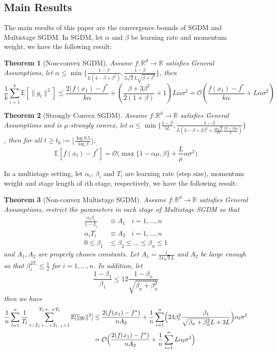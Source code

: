 \documentclass{article}
\newtheorem{theorem}{Theorem}[section]
\begin{document}
\subsection{Main Results}
The main results of this paper are the convergence bounds of SGDM and Multistage SGDM. In SGDM, let $\alpha$ and $\beta$ be learning rate and momentum weight, we have the following result:
\begin{theorem}[Non-convex SGDM] Assume $f:\mathbb{R}^d \rightarrow \mathbb{R}$ satisfies General Assumptions, let $\alpha \leq \min\{\frac{1 - \beta}{L(4 - \beta + \beta^2)}, \frac{1 - \beta}{2\sqrt{2}L\sqrt{\beta + \beta^2}}\}$, then
	\[
		\frac{1}{k}\sum_{i = 1}^{k}\mathbb{E}[\|g_t\|^2] \leq \frac{2 (f(x_1) - f^*}{k\alpha} + (\frac{\beta + 3\beta^2}{2 (1 + \beta)} + 1)L\alpha\sigma^2 = \mathcal{O}(\frac{f(x_1) - f^*}{k\alpha} + L\alpha\sigma^2)
	\]
\end{theorem}
\begin{theorem}[Strongly Convex SGDM] Assume $f:\mathbb{R}^d \rightarrow \mathbb{R}$ satisfies General Assumptions and is $\mu$-strongly convex, let $\alpha \leq \min\{\frac{1 - \beta}{5L}, \frac{1 - \beta}{L(3 - \beta + 2\beta^2 + \frac{48\sqrt{\beta}}{25}\frac{2L + 18\mu}{L})}\}$, then for all $t \geq t_0:= \lfloor\frac{\log 0.5}{\log \beta}\rfloor$, 
	\[
		\mathbb{E}[f(x_t) - f^*] = \mathcal{O}\bigl(\max\{1 - \alpha\mu, \beta\} + \frac{L}{\mu}\alpha\sigma^2\bigr)
	\]
\end{theorem}
In a multistage setting, let $\alpha_i$, $\beta_i$ and $T_i$ are learning rate (step size), momentum weight and stage length of $i$th stage, respectively, we have the following result:
\begin{theorem}[Non-convex Multistage SGDM] Assume $f:\mathbb{R}^d \rightarrow \mathbb{R}$ satisfies General Assumptions, restrict the parameters in each stage of Multistage SGDM so that 
\begin{equation}
\begin{split}
\frac{\alpha_i\beta_i}{1 - \beta_i} &\equiv A_1 \ \ \ \ i = 1,...,n\\
\alpha_iT_i &\equiv A_2 \ \ \ \ i = 1,...,n\\
0 \leq \beta_1 &\leq \beta_2 \leq ... \leq \beta_n \leq 1
\end{split}
\end{equation}
and $A_1, A_2$ are properly chosen constants. Let $A_1 = \frac{1}{24\sqrt{2}L}$ and $A_2$ be large enough so that $\beta_i^{2T_i} \leq \frac{1}{2}$ for $i = 1,...,n$. In addition, let
\[
\frac{1 - \beta_1}{\beta_1} \leq 12 \frac{1 - \beta_n}{\sqrt{\beta_n + \beta_n^2}}
\] then we have
\[
\begin{split}
\frac{1}{n}\sum_{l = 1}^{n}\frac{1}{T_l}\sum_{i = T_1 + ... + T_{l - 1} + 1}^{T_1 + .. + T_l}\mathbb{E}[\|g_t\|^2] &\leq \frac{2(f(x_1) - f^*)}{nA_2} + \frac{1}{n}\sum_{i = 1}^n\Bigl(24\beta^2_l\frac{\beta_1}{\sqrt{\beta_n + \beta_n^2}L + 3L}\Bigr)\alpha_l\sigma^2\\
&= \mathcal{O}\Bigl(\frac{2(f(x_1) - f^*)}{nA_2} + \frac{1}{n}\sum_{i = 1}^nL\alpha_l\sigma^2\Bigr)
\end{split}
\]
\end{theorem}
\end{document}
